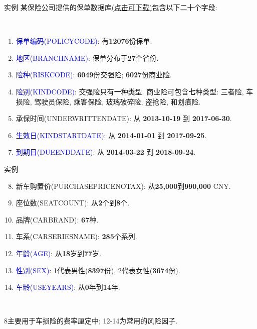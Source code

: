 \documentclass[professionalfont]{beamer}
\newcommand{\green}[1]{\textbf{#1}}
\newcommand{\blue}[1]{\textcolor{blue}{#1}}
\begin{document}
\begin{frame}{实例}
某保险公司提供的保单数据库\href{https://www.jianguoyun.com/p/DcrJkekQyKLGBhjEsUU}{(点击可下载)}包含以下二十个字段:
		
		~
		
		\begin{enumerate}
			\item \blue{保单编码(POLICYCODE)}: 有\green{12076}份保单.
			\item \blue{地区(BRANCHNAME)}: 保单分布于\green{27}个省份.
			\item \blue{险种(RISKCODE)}: \green{6049}份交强险; \green{6027}份商业险.  
			\item \blue{险别(KINDCODE)}: 交强险只有\green{一}种类型. 商业险可包含\green{七}种类型: 三者险, 车损险, 驾驶员保险, 乘客保险, 玻璃破碎险, 盗抢险, 和划痕险.
		\item 承保时间(UNDERWRITTENDATE): 从 \green{2013-10-19} 到 \green{2017-06-30}.
		\item \blue{生效日(KINDSTARTDATE)}: 从 \green{2014-01-01} 到 \green{2017-09-25}.
		\item \blue{到期日(DUEENDDATE)}: 从 \green{2014-03-22} 到 \green{2018-09-24}.
		\end{enumerate}
	\end{frame}
\begin{frame}{实例}	
\begin{enumerate}	
	\setcounter{enumi}{7}

\item 新车购置价(PURCHASEPRICENOTAX): 从\green{25,000}到\green{990,000} CNY.
\item 座位数(SEATCOUNT): 从\green{2}个到\green{8}个.
\item 品牌(CARBRAND): \green{67}种.
\item 车系(CARSERIESNAME): \green{285}个系列.
\item \blue{年龄(AGE)}:  从\green{18}岁到\green{77}岁.
\item \blue{性别(SEX)}: 1代表男性(\green{8397}份), 2代表女性(\green{3674}份). 
\item \blue{车龄(USEYEARS)}: 从\green{0}年到\green{14}年.
\end{enumerate}

~

8主要用于车损险的费率厘定中; 12-14为常用的风险因子.
\end{frame}
\end{document}
